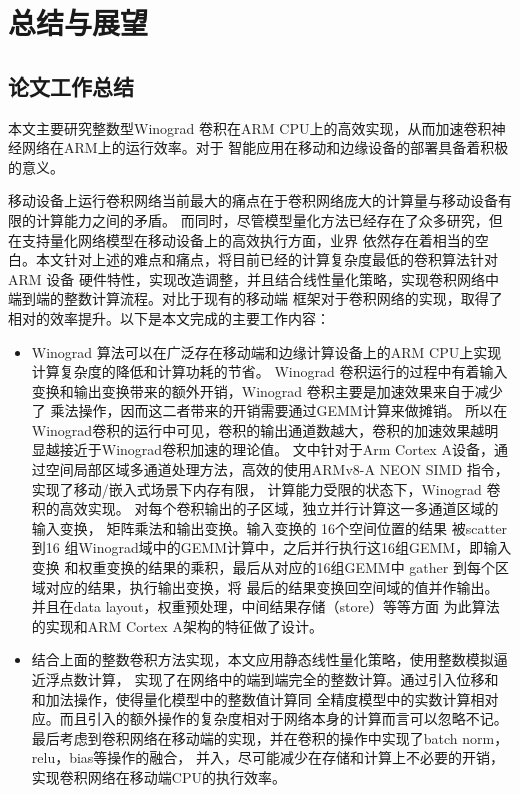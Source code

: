 \chapter{总结与展望}

\section{论文工作总结}

本文主要研究整数型Winograd 卷积在ARM CPU上的高效实现，从而加速卷积神经网络在ARM上的运行效率。对于
智能应用在移动和边缘设备的部署具备着积极的意义。

移动设备上运行卷积网络当前最大的痛点在于卷积网络庞大的计算量与移动设备有限的计算能力之间的矛盾。
而同时，尽管模型量化方法已经存在了众多研究，但在支持量化网络模型在移动设备上的高效执行方面，业界
依然存在着相当的空白。本文针对上述的难点和痛点，将目前已经的计算复杂度最低的卷积算法针对ARM 设备
硬件特性，实现改造调整，并且结合线性量化策略，实现卷积网络中端到端的整数计算流程。对比于现有的移动端
框架对于卷积网络的实现，取得了相对的效率提升。以下是本文完成的主要工作内容：

\begin{itemize}
    \item Winograd 算法可以在广泛存在移动端和边缘计算设备上的ARM CPU上实现计算复杂度的降低和计算功耗的节省。
    Winograd 卷积运行的过程中有着输入变换和输出变换带来的额外开销，Winograd 卷积主要是加速效果来自于减少了
    乘法操作，因而这二者带来的开销需要通过GEMM计算来做摊销。
    所以在Winograd卷积的运行中可见，卷积的输出通道数越大，卷积的加速效果越明显越接近于Winograd卷积加速的理论值。
    文中针对于Arm Cortex A设备，通过空间局部区域多通道处理方法，高效的使用ARMv8-A NEON SIMD 指令，
    实现了移动/嵌入式场景下内存有限， 计算能力受限的状态下，Winograd 卷积的高效实现。
    对每个卷积输出的子区域，独立并行计算这一多通道区域的输入变换， 矩阵乘法和输出变换。输入变换的
    16个空间位置的结果 被scatter到16 组Winograd域中的GEMM计算中，之后并行执行这16组GEMM，即输入变换
    和权重变换的结果的乘积，最后从对应的16组GEMM中 gather 到每个区域对应的结果，执行输出变换，将
    最后的结果变换回空间域的值并作输出。并且在data layout，权重预处理，中间结果存储（store）等等方面
    为此算法的实现和ARM Cortex A架构的特征做了设计。 
    \item 结合上面的整数卷积方法实现，本文应用静态线性量化策略，使用整数模拟逼近浮点数计算，
    实现了在网络中的端到端完全的整数计算。通过引入位移和和加法操作，使得量化模型中的整数值计算同
    全精度模型中的实数计算相对应。而且引入的额外操作的复杂度相对于网络本身的计算而言可以忽略不记。
    最后考虑到卷积网络在移动端的实现，并在卷积的操作中实现了batch norm，relu，bias等操作的融合，
    并入，尽可能减少在存储和计算上不必要的开销，实现卷积网络在移动端CPU的执行效率。
\end{itemize}

